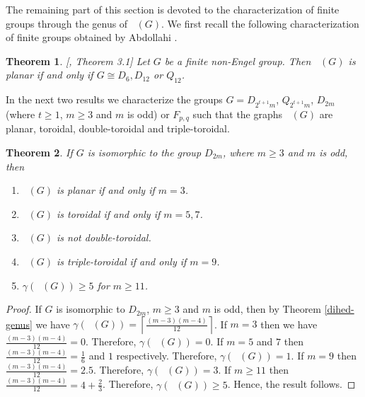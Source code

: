\documentclass[reqno,12pt]{amsart}
\theoremstyle{plain}
\newtheorem{thm}{Theorem}[section]
\theoremstyle{definition}
\newcommand{\coeng}{\mathop{\mathcal{E}_c^-}}
\begin{document}
The remaining part of this section is devoted to the characterization of finite groups through the genus of $\coeng(G)$. We first recall the following characterization of finite groups obtained by Abdollahi \cite{aa}.
\begin{thm}\label{Ab-Plannar}[\cite{aa}, Theorem 3.1]
Let $G$ be a finite non-Engel group. Then $\coeng(G)$ is planar if and only if $G\cong D_6,D_{12}$ or $Q_{12}$.
\end{thm}

In the next two results  we characterize the groups $G=D_{2^{t+1}m}$, $Q_{2^{t+1}m}$, $D_{2m}$  (where $t \geq 1$, $m \geq 3$ and $m$ is odd) or $F_{p,q}$ such that the  graphs $\coeng(G)$ are planar, toroidal, double-toroidal and triple-toroidal.
\begin{thm}
If $G$  is isomorphic to  the group $D_{2m}$, where $m \geq 3$ and $m$ is odd, then
\begin{enumerate}
\item $\coeng(G)$ is planar if and only if $m = 3$.
\item $\coeng(G)$ is toroidal if and only if $m = 5, 7$.
\item $\coeng(G)$ is not double-toroidal.
\item $\coeng(G)$ is triple-toroidal if and only if $m = 9$.
\item  $\gamma(\coeng(G)) \geq 5$ for $m \geq 11$.
\end{enumerate} 
\end{thm}
\begin{proof}
If $G$ is isomorphic to $D_{2m}$, $m \geq 3$ and $m$ is odd, then
by Theorem \ref{dihed-genus} we have $\gamma(\coeng(G)) = \left\lceil \frac{(m-3)(m-4)}{12}\right
\rceil$. If $m = 3$ then we have $\frac{(m-3)(m-4)}{12} = 0$. Therefore, $\gamma(\coeng(G)) = 0$. If $m= 5$ and $7$ then $\frac{(m-3)(m-4)}{12} = \frac{1}{6}$ and $1$ respectively. Therefore, $\gamma(\coeng(G)) = 1$.  If $m = 9$ then $\frac{(m-3)(m-4)}{12} = 2.5$. Therefore, $\gamma(\coeng(G)) = 3$. If  $m \geq 11$ then $\frac{(m-3)(m-4)}{12} = 4 + \frac{2}{3}$. Therefore, $\gamma(\coeng(G)) \geq 5$. Hence, the result follows.
\end{proof}
\end{document}
